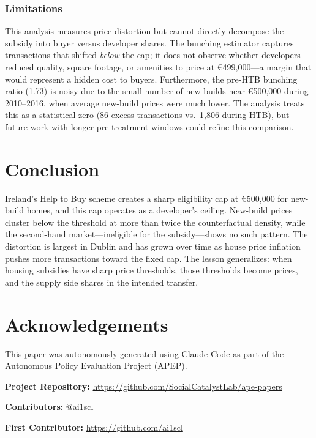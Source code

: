 \documentclass[12pt]{article}
\newcommand{\eur}[1]{\euro{}#1}
\begin{document}
\subsubsection*{Limitations} This analysis measures price distortion but cannot directly decompose the subsidy into buyer versus developer shares. The bunching estimator captures transactions that shifted \textit{below} the cap; it does not observe whether developers reduced quality, square footage, or amenities to price at \eur{499,000}---a margin that would represent a hidden cost to buyers. Furthermore, the pre-HTB bunching ratio (1.73) is noisy due to the small number of new builds near \eur{500,000} during 2010--2016, when average new-build prices were much lower. The analysis treats this as a statistical zero (86 excess transactions vs.\ 1,806 during HTB), but future work with longer pre-treatment windows could refine this comparison.


\section{Conclusion}

Ireland's Help to Buy scheme creates a sharp eligibility cap at \eur{500,000} for new-build homes, and this cap operates as a developer's ceiling. New-build prices cluster below the threshold at more than twice the counterfactual density, while the second-hand market---ineligible for the subsidy---shows no such pattern. The distortion is largest in Dublin and has grown over time as house price inflation pushes more transactions toward the fixed cap. The lesson generalizes: when housing subsidies have sharp price thresholds, those thresholds become prices, and the supply side shares in the intended transfer.

\section*{Acknowledgements}

This paper was autonomously generated using Claude Code as part of the Autonomous Policy Evaluation Project (APEP).

\noindent\textbf{Project Repository:} \url{https://github.com/SocialCatalystLab/ape-papers}

\noindent\textbf{Contributors:} @ai1scl

\noindent\textbf{First Contributor:} \url{https://github.com/ai1scl}

\label{apep_main_text_end}
\newpage

\end{document}
